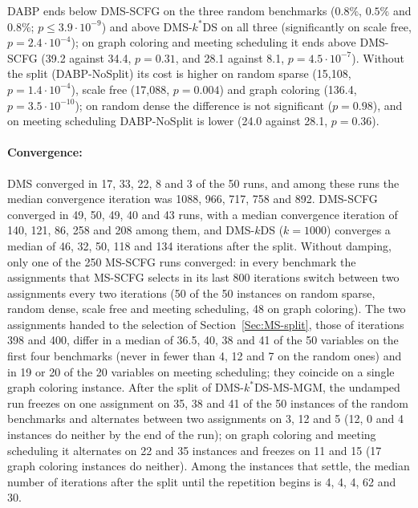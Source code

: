 DABP ends below DMS-SCFG on the three random benchmarks ($0.8\%$, $0.5\%$ and $0.8\%$; $p \le 3.9\cdot 10^{-9}$) and above DMS-$k^*$DS on all three (significantly on scale free, $p = 2.4\cdot 10^{-4}$); on graph coloring and meeting scheduling it ends above DMS-SCFG (39.2 against 34.4, $p = 0.31$, and 28.1 against 8.1, $p = 4.5\cdot 10^{-7}$). Without the split (DABP-NoSplit) its cost is higher on random sparse (15{,}108, $p = 1.4\cdot 10^{-4}$), scale free (17{,}088, $p = 0.004$) and graph coloring (136.4, $p = 3.5\cdot 10^{-10}$); on random dense the difference is not significant ($p = 0.98$), and on meeting scheduling DABP-NoSplit is lower (24.0 against 28.1, $p = 0.36$).

\paragraph{Convergence:}
DMS converged in 17, 33, 22, 8 and 3 of the 50 runs, and among these runs the median convergence iteration was 1088, 966, 717, 758 and 892. DMS-SCFG converged in 49, 50, 49, 40 and 43 runs, with a median convergence iteration of 140, 121, 86, 258 and 208 among them, and DMS-$k$DS ($k = 1000$) converges a median of 46, 32, 50, 118 and 134 iterations after the split. Without damping, only one of the 250 MS-SCFG runs converged: in every benchmark the assignments that MS-SCFG selects in its last 800 iterations switch between two assignments every two iterations (50 of the 50 instances on random sparse, random dense, scale free and meeting scheduling, 48 on graph coloring). The two assignments handed to the selection of Section~\ref{Sec:MS-split}, those of iterations 398 and 400, differ in a median of 36.5, 40, 38 and 41 of the 50 variables on the first four benchmarks (never in fewer than 4, 12 and 7 on the random ones) and in 19 or 20 of the 20 variables on meeting scheduling; they coincide on a single graph coloring instance. After the split of DMS-$k^*$DS-MS-MGM, the undamped run freezes on one assignment on 35, 38 and 41 of the 50 instances of the random benchmarks and alternates between two assignments on 3, 12 and 5 (12, 0 and 4 instances do neither by the end of the run); on graph coloring and meeting scheduling it alternates on 22 and 35 instances and freezes on 11 and 15 (17 graph coloring instances do neither). Among the instances that settle, the median number of iterations after the split until the repetition begins is 4, 4, 4, 62 and 30.

